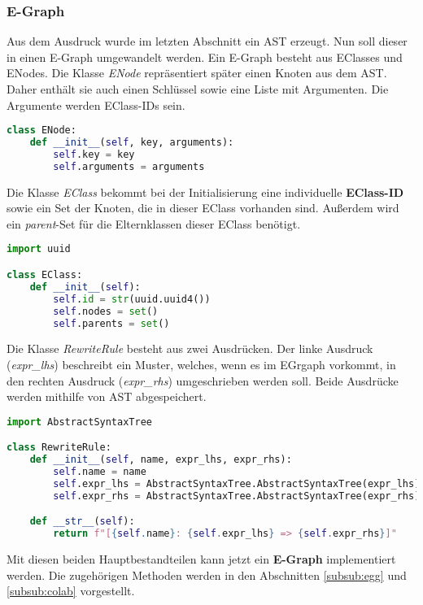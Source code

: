 \subsubsection{E-Graph}

Aus dem Ausdruck wurde im letzten Abschnitt ein AST erzeugt. Nun soll dieser in einen E-Graph umgewandelt werden. Ein E-Graph besteht aus EClasses und ENodes.
Die Klasse \textit{ENode} repräsentiert später einen Knoten aus dem AST. Daher enthält sie auch einen Schlüssel sowie eine Liste mit Argumenten. Die Argumente werden 
EClass-IDs sein.

\begin{lstlisting}[language=Python, caption=Klasse \textit{ENode}]
class ENode:
    def __init__(self, key, arguments):
        self.key = key
        self.arguments = arguments
\end{lstlisting}

Die Klasse \textit{EClass} bekommt bei der Initialisierung eine individuelle \textbf{EClass-ID} sowie ein Set der Knoten, die in dieser EClass vorhanden sind. Außerdem
wird ein \textit{parent}-Set für die Elternklassen dieser EClass benötigt.

\begin{lstlisting}[language=Python, caption=Klasse \textit{EClass}]
import uuid

class EClass:
    def __init__(self):
        self.id = str(uuid.uuid4())
        self.nodes = set()
        self.parents = set()
\end{lstlisting}

Die Klasse \textit{RewriteRule} besteht aus zwei Ausdrücken. Der linke Ausdruck (\textit{expr\_lhs}) beschreibt ein Muster, welches, wenn es im EGrgaph vorkommt, in den
rechten Ausdruck (\textit{expr\_rhs}) umgeschrieben werden soll.
Beide Ausdrücke werden mithilfe von AST abgespeichert.

\begin{lstlisting}[language=Python, caption=Klasse \textit{RewriteRule}]
import AbstractSyntaxTree

class RewriteRule:
    def __init__(self, name, expr_lhs, expr_rhs):
        self.name = name
        self.expr_lhs = AbstractSyntaxTree.AbstractSyntaxTree(expr_lhs)
        self.expr_rhs = AbstractSyntaxTree.AbstractSyntaxTree(expr_rhs)

    def __str__(self):
        return f"[{self.name}: {self.expr_lhs} => {self.expr_rhs}]"
\end{lstlisting}


Mit diesen beiden Hauptbestandteilen kann jetzt ein \textbf{E-Graph} implementiert werden. 
Die zugehörigen Methoden werden in den Abschnitten \ref{subsub:egg} und \ref{subsub:colab} vorgestellt.

